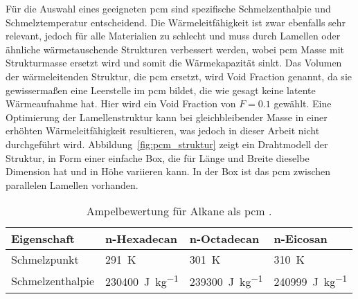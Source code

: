 Für die Auswahl eines geeigneten \ac{pcm} sind spezifische Schmelzenthalpie und Schmelztemperatur entscheidend.
Die Wärmeleitfähigkeit ist zwar ebenfalls sehr relevant, jedoch für alle Materialien zu schlecht und muss durch Lamellen oder ähnliche wärmetauschende Strukturen verbessert werden,
wobei \ac{pcm} Masse mit Strukturmasse ersetzt wird und somit die Wärmekapazität sinkt. Das Volumen der wärmeleitenden Struktur, die
\ac{pcm} ersetzt, wird Void Fraction genannt, da sie gewissermaßen eine Leerstelle im \ac{pcm} bildet, die wie gesagt keine latente Wärmeaufnahme hat. Hier
wird ein Void Fraction von $F = 0.1$ gewählt. Eine Optimierung der Lamellenstruktur kann bei gleichbleibender Masse in einer erhöhten
Wärmeleitfähigkeit resultieren, was jedoch in dieser Arbeit nicht durchgeführt wird. Abbildung~\ref{fig:pcm_struktur} zeigt ein Drahtmodell der Struktur,
in Form einer einfache Box, die für Länge und Breite dieselbe Dimension hat und in Höhe variieren kann. In der Box ist
das \ac{pcm} zwischen parallelen Lamellen vorhanden.

\begin{table}
  \centering
  \caption{Ampelbewertung für Alkane als \acs{pcm} \cite{NIST}.}\label{tab:pcm_auswahl}
  \label{tab:pcm_alkane_nist}
  \begin{tabular}{>{\raggedright\arraybackslash}m{3.1cm} m{3.1cm} m{3.1cm} m{3.1cm}}
    \toprule[1pt]
    Eigenschaft & n-Hexadecan & n-Octadecan & n-Eicosan \\
    \midrule[0.5pt]

    Schmelzpunkt
      & \cellcolor{bad}\SI{291}{\kelvin}
      & \cellcolor{medium}\SI{301}{\kelvin}
      & \cellcolor{good}\SI{310}{\kelvin} \\

    Schmelzenthalpie
      & \cellcolor{bad}\SI{230400}{\joule\per\kilo\gram}
      & \cellcolor{medium}\SI{239300}{\joule\per\kilo\gram}
      & \cellcolor{good}\SI{240999}{\joule\per\kilo\gram} \\
    \bottomrule[1pt]
  \end{tabular}
\end{table}

